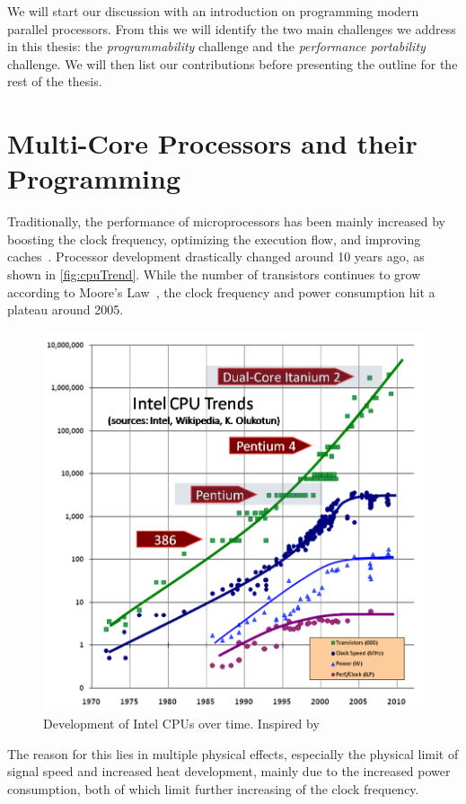 \noindent
We will start our discussion with an introduction on programming modern parallel processors.
From this we will identify the two main challenges we address in this thesis:
the \emph{programmability} challenge and the \emph{performance portability} challenge.
We will then list our contributions before presenting the outline for the rest of the thesis.

\section{Multi-Core Processors and their Programming}

Traditionally, the performance of microprocessors has been mainly increased by boosting the clock frequency, optimizing the execution flow, and improving caches~\cite{Sutter2005}.
Processor development drastically changed around 10 years ago, as shown in \autoref{fig:cpuTrend}.
While the number of transistors continues to grow according to Moore's Law~\cite{Moore1998}, the clock frequency and power consumption hit a plateau around 2005.
\begin{figure}
  \centering
  \includegraphics[width=.9\linewidth]{Figures/CPUTrend.png}
  \caption{Development of Intel CPUs over time. Inspired by~\cite{Sutter2005}}
  \label{fig:cpuTrend}
\end{figure} 
The reason for this lies in multiple physical effects, especially the physical limit of signal speed and increased heat development,  mainly due to the increased power consumption, both of which limit further increasing of the clock frequency.
